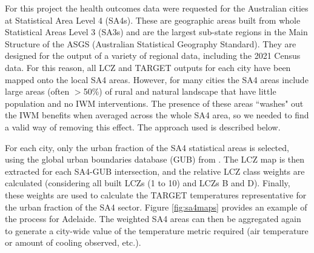 \documentclass[utf8]{frontiersSCNS} %
\begin{document}
For this project the health outcomes data were requested for the Australian cities at Statistical Area Level 4 (SA4s). These are geographic areas built from whole Statistical Areas Level 3 (SA3s) and are the largest sub-state regions in the Main Structure of the ASGS (Australian Statistical Geography Standard). They are designed for the output of a variety of regional data, including the 2021 Census data. For this reason, all LCZ and TARGET outputs for each city have been mapped onto the local SA4 areas. However, for many cities the SA4 areas include large areas (often $>$50\%) of rural and natural landscape that have little population and no IWM interventions. The presence of these areas ``washes" out the IWM benefits when averaged across the whole SA4 area, so we needed to find a valid way of removing this effect. The approach used is described below.

For each city, only the urban fraction of the SA4 statistical areas is selected, using the global urban boundaries database (GUB) from \cite{Li2020b}. The LCZ map is then extracted for each SA4-GUB intersection, and the relative LCZ class weights are calculated (considering all built LCZs (1 to 10) and LCZs B and D). Finally, these weights are used to calculate the TARGET temperatures representative for the urban fraction of the SA4 sector. Figure \ref{fig:sa4maps} provides an example of the process for Adelaide. The weighted SA4 areas can then be aggregated again to generate a city-wide value of the temperature metric required (air temperature or amount of cooling observed, etc.).
\end{document}
